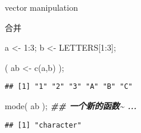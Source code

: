 \documentclass[ignorenonframetext,]{beamer}
\newenvironment{Shaded}{\begin{snugshade}}{\end{snugshade}}
\newcommand{\DecValTok}[1]{\textcolor[rgb]{0.00,0.00,0.81}{#1}}
\newcommand{\DocumentationTok}[1]{\textcolor[rgb]{0.56,0.35,0.01}{\textbf{\textit{#1}}}}
\newcommand{\FunctionTok}[1]{\textcolor[rgb]{0.00,0.00,0.00}{#1}}
\newcommand{\NormalTok}[1]{#1}
\newcommand{\OtherTok}[1]{\textcolor[rgb]{0.56,0.35,0.01}{#1}}
\newcommand{\SpecialCharTok}[1]{\textcolor[rgb]{0.00,0.00,0.00}{#1}}
\newcommand\FontSmall{\fontsize{7}{8}\selectfont}
\begin{document}
\begin{frame}[fragile]{vector manipulation}
\protect\hypertarget{vector-manipulation}{}
\begin{block}{合并}
\protect\hypertarget{ux5408ux5e76}{}
\FontSmall

\begin{Shaded}
\begin{Highlighting}[]
\NormalTok{a }\OtherTok{\textless{}{-}} \DecValTok{1}\SpecialCharTok{:}\DecValTok{3}\NormalTok{;}
\NormalTok{b }\OtherTok{\textless{}{-}}\NormalTok{ LETTERS[}\DecValTok{1}\SpecialCharTok{:}\DecValTok{3}\NormalTok{];}

\NormalTok{( ab }\OtherTok{\textless{}{-}} \FunctionTok{c}\NormalTok{(a,b) );}
\end{Highlighting}
\end{Shaded}

\begin{verbatim}
## [1] "1" "2" "3" "A" "B" "C"
\end{verbatim}

\begin{Shaded}
\begin{Highlighting}[]
\FunctionTok{mode}\NormalTok{( ab ); }\DocumentationTok{\#\# 一个新的函数\textasciitilde{} ... }
\end{Highlighting}
\end{Shaded}

\begin{verbatim}
## [1] "character"
\end{verbatim}
\end{block}
\end{frame}
\end{document}
